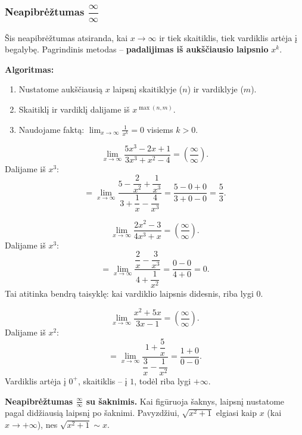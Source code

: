 \subsubsection*{Neapibrėžtumas $\dfrac{\infty}{\infty}$}

Šis neapibrėžtumas atsiranda, kai $x \to \infty$ ir tiek skaitiklis, tiek vardiklis artėja
į begalybę. Pagrindinis metodas -- \textbf{padalijimas iš aukščiausio laipsnio} $x^k$.

\textbf{Algoritmas:}
\begin{enumerate}[label=\arabic*.]
  \item Nustatome aukščiausią $x$ laipsnį skaitiklyje ($n$) ir vardiklyje ($m$).
  \item Skaitiklį ir vardiklį dalijame iš $x^{\max(n,m)}$.
  \item Naudojame faktą: $\lim_{x\to\infty} \frac{1}{x^k} = 0$ visiems $k > 0$.
\end{enumerate}

\begin{example}
\[
  \lim_{x \to \infty} \frac{5x^3 - 2x + 1}{3x^3 + x^2 - 4}
  = \left(\frac{\infty}{\infty}\right).
\]
Dalijame iš $x^3$:
\[
  = \lim_{x \to \infty}
    \frac{5 - \dfrac{2}{x^2} + \dfrac{1}{x^3}}{3 + \dfrac{1}{x} - \dfrac{4}{x^3}}
  = \frac{5 - 0 + 0}{3 + 0 - 0}
  = \frac{5}{3}.
\]
\end{example}

\begin{example}
\[
  \lim_{x \to \infty} \frac{2x^2 - 3}{4x^3 + x}
  = \left(\frac{\infty}{\infty}\right).
\]
Dalijame iš $x^3$:
\[
  = \lim_{x \to \infty}
    \frac{\dfrac{2}{x} - \dfrac{3}{x^3}}{4 + \dfrac{1}{x^2}}
  = \frac{0 - 0}{4 + 0}
  = 0.
\]
Tai atitinka bendrą taisyklę: kai vardiklio laipsnis didesnis, riba lygi $0$.
\end{example}

\begin{example}
\[
  \lim_{x \to \infty} \frac{x^2 + 5x}{3x - 1}
  = \left(\frac{\infty}{\infty}\right).
\]
Dalijame iš $x^2$:
\[
  = \lim_{x \to \infty}
    \frac{1 + \dfrac{5}{x}}{\dfrac{3}{x} - \dfrac{1}{x^2}}
  = \frac{1 + 0}{0 - 0}.
\]
Vardiklis artėja į $0^+$, skaitiklis -- į $1$, todėl riba lygi $+\infty$.
\end{example}

\textbf{Neapibrėžtumas $\frac{\infty}{\infty}$ su šaknimis.}
Kai figūruoja šaknys, laipsnį nustatome pagal didžiausią laipsnį po šaknimi.
Pavyzdžiui, $\sqrt{x^2 + 1}$ elgiasi kaip $x$ (kai $x \to +\infty$), nes
$\sqrt{x^2+1} \sim x$.

